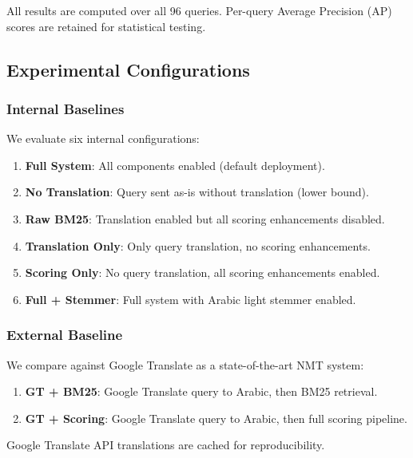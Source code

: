 \documentclass[preprint,12pt,numbers]{elsarticle}
\begin{document}
All results are computed over all 96 queries. Per-query Average Precision (AP) scores are retained for statistical testing.

\subsection{Experimental Configurations}

\subsubsection{Internal Baselines}
We evaluate six internal configurations:
\begin{enumerate}
    \item \textbf{Full System}: All components enabled (default deployment).
    \item \textbf{No Translation}: Query sent as-is without translation (lower bound).
    \item \textbf{Raw BM25}: Translation enabled but all scoring enhancements disabled.
    \item \textbf{Translation Only}: Only query translation, no scoring enhancements.
    \item \textbf{Scoring Only}: No query translation, all scoring enhancements enabled.
    \item \textbf{Full + Stemmer}: Full system with Arabic light stemmer enabled.
\end{enumerate}

\subsubsection{External Baseline}
We compare against Google Translate as a state-of-the-art NMT system:
\begin{enumerate}
    \item \textbf{GT + BM25}: Google Translate query to Arabic, then BM25 retrieval.
    \item \textbf{GT + Scoring}: Google Translate query to Arabic, then full scoring pipeline.
\end{enumerate}

Google Translate API translations are cached for reproducibility.
\end{document}
